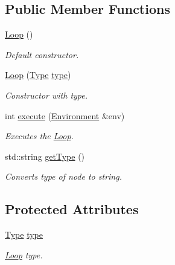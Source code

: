 \subsection*{Public Member Functions}
\begin{DoxyCompactItemize}
\item 
\hypertarget{classLoop_a675e74b960c5e703adf1ee0e6fd8f3bf}{}\hyperlink{classLoop_a675e74b960c5e703adf1ee0e6fd8f3bf}{Loop} ()\label{classLoop_a675e74b960c5e703adf1ee0e6fd8f3bf}

\begin{DoxyCompactList}\small\item\em Default constructor. \end{DoxyCompactList}\item 
\hyperlink{classLoop_a3e42ab398babe1ba79e9242d64147960}{Loop} (\hyperlink{classLoop_af57e9c094063c514758dfe7bd986d6e7}{Type} \hyperlink{classLoop_ae5e7c727c194b408bfc69b3f218c8b6f}{type})
\begin{DoxyCompactList}\small\item\em Constructor with type. \end{DoxyCompactList}\item 
int \hyperlink{classLoop_a32977a6ab0e1311d78c603db03f895d4}{execute} (\hyperlink{classEnvironment}{Environment} \&env)
\begin{DoxyCompactList}\small\item\em Executes the \hyperlink{classLoop}{Loop}. \end{DoxyCompactList}\item 
std\+::string \hyperlink{classLoop_a657b90074652fce7ab2028bdc3747b7b}{get\+Type} ()
\begin{DoxyCompactList}\small\item\em Converts type of node to string. \end{DoxyCompactList}\end{DoxyCompactItemize}
\subsection*{Protected Attributes}
\begin{DoxyCompactItemize}
\item 
\hypertarget{classLoop_ae5e7c727c194b408bfc69b3f218c8b6f}{}\hyperlink{classLoop_af57e9c094063c514758dfe7bd986d6e7}{Type} \hyperlink{classLoop_ae5e7c727c194b408bfc69b3f218c8b6f}{type}\label{classLoop_ae5e7c727c194b408bfc69b3f218c8b6f}

\begin{DoxyCompactList}\small\item\em \hyperlink{classLoop}{Loop} type. \end{DoxyCompactList}\end{DoxyCompactItemize}


